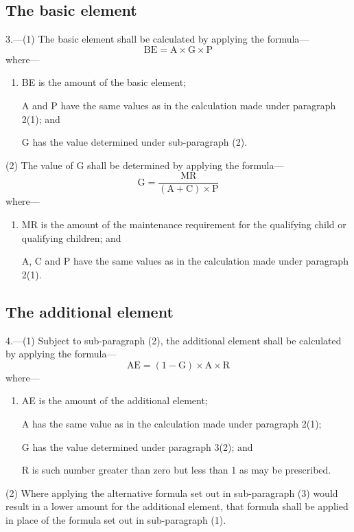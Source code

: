 \documentclass[12pt,a4paper]{article}
\begin{document}
{\subsection*{The basic element}

3.---(1) The basic element shall be calculated by applying the formula---
\[\textrm{BE} = \textrm{A} \times \textrm{G} \times \textrm{P}
\]
where---
\begin{enumerate}\item[]
BE is the amount of the basic element;

A and P have the same values as in the calculation made under paragraph 2(1); and

G has the value determined under sub-paragraph (2).
\end{enumerate}

(2) The value of G shall be determined by applying the formula---
\[\textrm{G} = \frac { \textrm{MR} } { (\textrm{A} + \textrm{C}) \times \textrm{P}}\]
where---
\begin{enumerate}\item[]
MR is the amount of the maintenance requirement for the qualifying child or qualifying children; and

A, C and P have the same values as in the calculation made under paragraph 2(1).
\end{enumerate}

\subsection*{The additional element}

4.---(1) Subject to sub-paragraph (2), the additional element shall be calculated by applying the formula---
\[
\textrm{AE} = (1 - \textrm{G}) \times \textrm{A} \times \textrm{R}
\]
where---
\begin{enumerate}\item[]
AE is the amount of the additional element;

A has the same value as in the calculation made under paragraph 2(1);


G has the value determined under paragraph 3(2); and

R is such number greater than zero but less than 1 as may be prescribed.
\end{enumerate}

(2) Where applying the alternative formula set out in sub-paragraph (3) would result in a lower amount for the additional element, that formula shall be applied in place of the formula set out in sub-paragraph (1).

}
\end{document}
